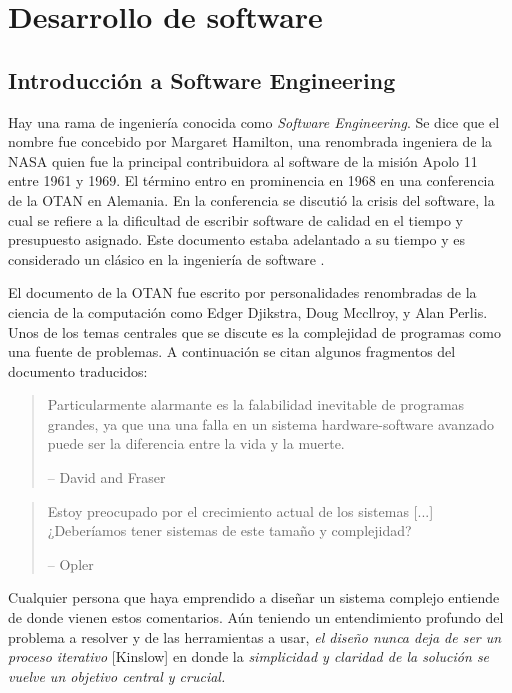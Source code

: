 \section{Desarrollo de software}

\subsection{Introducción a Software Engineering}

Hay una rama de ingeniería conocida como \textit{Software Engineering}. Se dice que el nombre fue concebido por Margaret Hamilton, una renombrada ingeniera de la NASA quien fue la principal contribuidora al software de la misión Apolo 11 entre 1961 y 1969. El término entro en prominencia en 1968 en una conferencia de la OTAN en Alemania. En la conferencia se discutió la crisis del software, la cual se refiere a la dificultad de escribir software de calidad en el tiempo y presupuesto asignado. Este documento estaba adelantado a su tiempo y es considerado un clásico en la ingeniería de software \citep{natoSoftwareEngineering}.

\medskip

El documento de la OTAN fue escrito por personalidades renombradas de la ciencia de la computación como Edger Djikstra, Doug Mccllroy, y Alan Perlis. Unos de los temas centrales que se discute es la complejidad de programas como una fuente de problemas. A continuación se citan algunos fragmentos del documento traducidos:
\begin{quote}
    Particularmente alarmante es la falabilidad inevitable de programas grandes, ya que una una falla en un sistema hardware-software avanzado puede ser la diferencia entre la vida y la muerte.

    -- David and Fraser
\end{quote}

\begin{quote}
   Estoy preocupado por el crecimiento actual de los sistemas [...] ¿Deberíamos tener sistemas de este tamaño y complejidad?

    -- Opler
\end{quote}

Cualquier persona que haya emprendido a diseñar un sistema complejo entiende de donde vienen estos comentarios. Aún teniendo un entendimiento profundo del problema a resolver y de las herramientas a usar, \textit{el diseño nunca deja de ser un proceso iterativo} [Kinslow] en donde la \textit{simplicidad y claridad de la solución se vuelve un objetivo central y crucial.}



